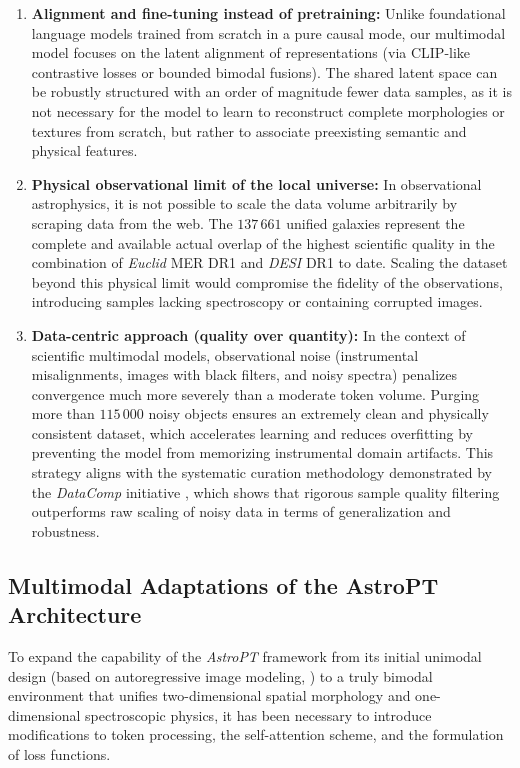 \begin{enumerate}
\item \textbf{Alignment and fine-tuning instead of pretraining:} Unlike foundational language models trained from scratch in a pure causal mode, our multimodal model focuses on the latent alignment of representations (via CLIP-like contrastive losses or bounded bimodal fusions). The shared latent space can be robustly structured with an order of magnitude fewer data samples, as it is not necessary for the model to learn to reconstruct complete morphologies or textures from scratch, but rather to associate preexisting semantic and physical features.
\item \textbf{Physical observational limit of the local universe:} In observational astrophysics, it is not possible to scale the data volume arbitrarily by scraping data from the web. The $137\,661$ unified galaxies represent the complete and available actual overlap of the highest scientific quality in the combination of \textit{Euclid} MER DR1 and \textit{DESI} DR1 to date. Scaling the dataset beyond this physical limit would compromise the fidelity of the observations, introducing samples lacking spectroscopy or containing corrupted images.
\item \textbf{Data-centric approach (quality over quantity):} In the context of scientific multimodal models, observational noise (instrumental misalignments, images with black filters, and noisy spectra) penalizes convergence much more severely than a moderate token volume. Purging more than $115\,000$ noisy objects ensures an extremely clean and physically consistent dataset, which accelerates learning and reduces overfitting by preventing the model from memorizing instrumental domain artifacts. This strategy aligns with the systematic curation methodology demonstrated by the \textit{DataComp} initiative \autocite{ar:gadre-2023}, which shows that rigorous sample quality filtering outperforms raw scaling of noisy data in terms of generalization and robustness.
\end{enumerate}

\subsection{Multimodal Adaptations of the AstroPT Architecture}

To expand the capability of the \textit{AstroPT} framework from its initial unimodal design (based on autoregressive image modeling, \textcite{ar:astropt}) to a truly bimodal environment that unifies two-dimensional spatial morphology and one-dimensional spectroscopic physics, it has been necessary to introduce modifications to token processing, the self-attention scheme, and the formulation of loss functions.

